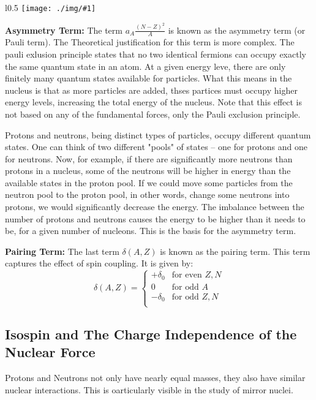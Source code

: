 \documentclass[10pt,a4paper]{article}
\newcounter{figurecounter}
\newcommand{\imgl}[3]{
    \begin{wrapfigure}{l}{#2\linewidth}
        \centering
        \captionsetup{justification=centering,margin=2cm,labelformat=empty}
        \texttt{[image: ./img/\#1]}
        \label{figure}
        \caption{\textbf{fig: \thefigurecounter} -- \textcolor{darkliver}{#3}}
    \end{wrapfigure}}
\begin{document}
\imgl{asymmetry}{0.5}{Asymmetry Term}
\textbf{Asymmetry Term:} The term $a_A\frac{(N-Z)^2}{A}$ is known as the asymmetry term (or Pauli term). The Theoretical justification for this term is more complex. The pauli exlusion principle states that no two identical fermions can occupy exactly the same quantum state in an atom. At a given energy leve, there are only finitely many quantum states available for particles. What this means in the nucleus is that as more particles are added, thses partices must occupy higher energy levels, increasing the total energy of the nucleus. Note that this effect is not based on any of the fundamental forces, only the Pauli exclusion principle. 

Protons and neutrons, being distinct types of particles, occupy different quantum states. One can think of two different "pools" of states – one for protons and one for neutrons. Now, for example, if there are significantly more neutrons than protons in a nucleus, some of the neutrons will be higher in energy than the available states in the proton pool. If we could move some particles from the neutron pool to the proton pool, in other words, change some neutrons into protons, we would significantly decrease the energy. The imbalance between the number of protons and neutrons causes the energy to be higher than it needs to be, for a given number of nucleons. This is the basis for the asymmetry term.


\textbf{Pairing Term:} The last term $\delta(A,Z)$ is known as the pairing term. This term captures the effect of spin coupling. It is given by:
\begin{equation}
    \delta(A,Z) =\left\{ 
    \begin{array}{ll}
        +\delta_0 & \text{for even } Z, N\\
        0 & \text{for odd } A\\
        -\delta_0 & \text{for odd } Z, N\\
    \end{array}\right.
\end{equation}

\subsection{Isospin and The Charge  Independence of the Nuclear Force}
Protons and Neutrons not only have nearly equal masses, they also have similar nuclear interactions. This is oarticularly visible in the study of mirror nuclei.
\end{document}
